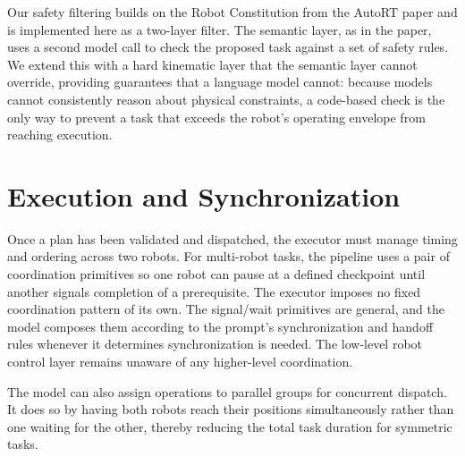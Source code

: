 Our safety filtering builds on the Robot Constitution from the AutoRT paper and is implemented here as a two-layer filter. The semantic layer, as in the paper, uses a second model call to check the proposed task against a set of safety rules. We extend this with a hard kinematic layer that the semantic layer cannot override, providing guarantees that a language model cannot: because models cannot consistently reason about physical constraints, a code-based check is the only way to prevent a task that exceeds the robot's operating envelope from reaching execution.

\section{Execution and Synchronization}
Once a plan has been validated and dispatched, the executor must manage timing and ordering across two robots. For multi-robot tasks, the pipeline uses a pair of coordination primitives so one robot can pause at a defined checkpoint until another signals completion of a prerequisite. The executor imposes no fixed coordination pattern of its own. The signal/wait primitives are general, and the model composes them according to the prompt’s synchronization and handoff rules whenever it determines synchronization is needed. The low-level robot control layer remains unaware of any higher-level coordination.

The model can also assign operations to parallel groups for concurrent dispatch. It does so by having both robots reach their positions simultaneously rather than one waiting for the other, thereby reducing the total task duration for symmetric tasks.

